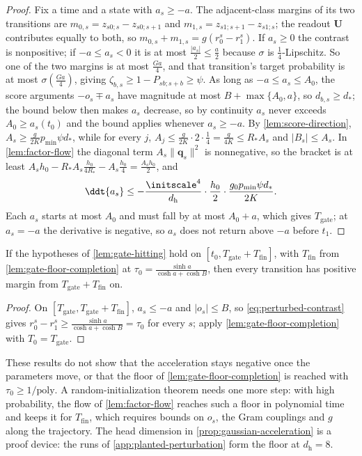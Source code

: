 \begin{proof}
Fix a time and a state with $a_s\ge-a$. The adjacent-class margins of its two transitions are $m_{0,s}=z_{s0;s}-z_{s0;s+1}$ and
$m_{1,s}=z_{s1;s+1}-z_{s1;s}$; the readout $\mathbf U$ contributes equally to both, so $m_{0,s}+m_{1,s}=g(r^s_0-r^s_1)$. If $a_s\ge0$ the contrast is
nonpositive; if $-a\le a_s<0$ it is at most $\frac{|a_s|}2\le\frac a2$ because $\sigma$ is $\frac14$-Lipschitz. So one of the two margins is at most
$\frac{Ga}4$, and that transition's target probability is at most $\sigma(\frac{Ga}4)$, giving $\zeta_{b,s}\ge1-P_{sb;s+b}\ge\psi$. As long as
$-a\le a_s\le A_0$, the score arguments $-o_s\mp a_s$ have magnitude at most $B+\max\{A_0,a\}$, so $d_{b,s}\ge d_\ast$; the bound below then
makes $a_s$ decrease, so by continuity $a_s$ never exceeds $A_0\ge a_s(t_0)$ and the bound applies whenever $a_s\ge-a$. By \cref{lem:score-direction},
$A_s\ge\frac{g}{2K}p_{\min}\psi d_\ast$, while for every $j$, $A_j\le\frac{g}{2K}\cdot2\cdot\frac14=\frac g{4K}\le R_\ast A_s$ and $|B_s|\le A_s$. In
\cref{lem:factor-flow} the diagonal term $A_s\|\bm q_s\|^2$ is nonnegative, so the bracket is at least
$A_sh_0-R_\ast A_s\frac{h_0}{4R_\ast}-A_s\frac{h_0}4=\frac{A_sh_0}2$, and
\[
 \ddt{a_s}\le-\frac{\initscale^4}{d_{\mathrm h}}\cdot\frac{h_0}2\cdot\frac{g_0p_{\min}\psi d_\ast}{2K}.
\]
Each $a_s$ starts at most $A_0$ and must fall by at most $A_0+a$, which gives $T_{\mathrm{gate}}$; at $a_s=-a$ the derivative is negative, so
$a_s$ does not return above $-a$ before $t_1$.
\end{proof}

\begin{corollary}
\label{cor:conditional-bootstrap}
If the hypotheses of \cref{lem:gate-hitting} hold on $[t_0,T_{\mathrm{gate}}+T_{\mathrm{fin}}]$, with $T_{\mathrm{fin}}$ from
\cref{lem:gate-floor-completion} at $\tau_0=\frac{\sinh a}{\cosh a+\cosh B}$, then every transition has positive margin from
$T_{\mathrm{gate}}+T_{\mathrm{fin}}$ on.
\end{corollary}

\begin{proof}
On $[T_{\mathrm{gate}},T_{\mathrm{gate}}+T_{\mathrm{fin}}]$, $a_s\le-a$ and $|o_s|\le B$, so \cref{eq:perturbed-contrast} gives
$r^s_0-r^s_1\ge\frac{\sinh a}{\cosh a+\cosh B}=\tau_0$ for every $s$; apply \cref{lem:gate-floor-completion} with $T_0=T_{\mathrm{gate}}$.
\end{proof}

These results do not show that the acceleration stays negative once the parameters move, or that the floor of
\cref{lem:gate-floor-completion} is reached with $\tau_0\ge1/\mathrm{poly}$. A random-initialization theorem needs one more step: with high
probability, the flow of \cref{lem:factor-flow} reaches such a floor in polynomial time and keeps it for $T_{\mathrm{fin}}$, which requires bounds on
$o_s$, the Gram couplings and $g$ along the trajectory. The head dimension in \cref{prop:gaussian-acceleration} is a proof device: the runs of
\cref{app:planted-perturbation} form the floor at $d_{\mathrm h}=8$.

